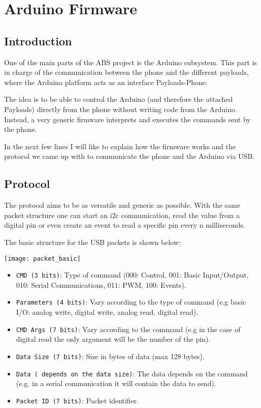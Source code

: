\documentclass[12pt,a4paper]{report}
\begin{document}
\section*{Arduino Firmware}

\subsection*{Introduction}

One of the main parts of the ABS project is the Arduino subsystem. This part is in charge of the communication between the phone and the different payloads, where the Arduino platform acts as an interface Payloads-Phone.

The idea is to be able to control the Arduino (and therefore the attached Payloads) directly from the phone without writing code from the Arduino. Instead, a very generic firmware interprets and executes the commands sent by the phone.

In the next few lines I will like to explain how the firmware works and the protocol we came up with to communicate the phone and the Arduino via USB.

\subsection*{Protocol}

The protocol aims to be as versatile and generic as possible. With the same packet structure one can start an i2c communication, read the value from a digital pin or even create an event to read a specific pin every n milliseconds.

The basic structure for the USB packets is shown below:

\texttt{[image: packet\_basic]}

\begin{itemize}
\item \texttt{CMD (3 bits)}: Type of command (000: Control, 001: Basic Input/Output, 010: Serial Communications, 011: PWM, 100: Events).

\item \texttt{Parameters (4 bits)}: Vary according to the type of command (e.g basic I/O: analog write, digital write, analog read, digital read).

\item \texttt{CMD Args (7 bits)}: Vary according to the command (e.g in the case of digital read the only argument will be the number of the pin).

\item \texttt{Data Size (7 bits)}: Size in bytes of data (max 128 bytes).

\item \texttt{Data ( depends on the data size)}: The data depends on the command (e.g. in a serial communication it will contain the data to send).

\item \texttt{Packet ID (7 bits)}: Packet identifier.

\end{itemize}
\end{document}
